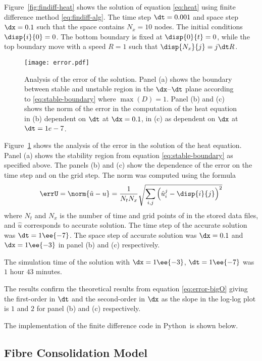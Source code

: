 \documentclass[twoside,a4paper,12pt,draft]{article}
\newcommand{\figref}[1]{Figure~\ref{#1}}
\newcommand{\prog}[1]{\textsf{#1}}
\newcommand{\python}{\prog{Python}}
\begin{document}
\figref{fig:findiff-heat} shows the solution of equation
\eqref{eq:heat} using finite difference method
\eqref{eq:findiff-alg}. The time step $\dt=0.001$ and space step
$\dx = 0.1$ such that the space contains $N_x=10$ nodes. The initial
conditions $\disp{i}{0} = 0$. The bottom boundary is fixed at
$\disp{0}{t} = 0$, while the top boundary move with a speed $R=1$ such
that $\disp{N_x}{j} = j \dt R$.


\begin{figure}
  \centering
  \texttt{[image: error.pdf]}
  \caption{Analysis of the error of the solution. Panel (a) shows the
    boundary between stable and unstable region in the $\dx$--$\dt$
    plane according to \eqref{eq:stable-boundary} where $\max(D) =
    1$. Panel (b) and (c) shows the norm of the error in the
    computation of the heat equation in (b) dependent on $\dt$ at
    $\dx=0.1$, in (c) as dependent on $\dx$ at $\dt=1e-7$.}
  \label{fig:error-analysis}
\end{figure}

\figref{fig:error-analysis} shows the analysis of the error in the
solution of the heat equation. Panel (a) shows the stability region
from equation \eqref{eq:stable-boundary} as specified above. The
panels (b) and (c) show the dependence of the error on the time step
and on the grid step. The norm was computed using the formula
%
\begin{align}
  \errU = \norm{\hat{u} - u} = \frac{1}{N_t N_x}\sqrt{ \sum_{i,j} \left(\hat{u}_{i}^{j} - \disp{i}{j}\right)^2}
\end{align}
where $N_t$ and $N_x$ is the number of time and grid points of in the
stored data files, and $\hat{u}$ corresponds to accurate solution. The
time step of the accurate solution was $\dt = 1\ee{-7}$. The space step
of accurate solution was $\dx=0.1$ and $\dx=1\ee{-3}$ in panel (b) and
(c) respectively.

The simulation time of the solution with $\dx=1\ee{-3}$, $\dt=1\ee{-7}$
was $1$ hour $43$ minutes.

The results confirm the theoretical results from equation
\eqref{eq:error-bigO} giving the first-order in $\dt$ and the
second-order in $\dx$ as the slope in the log-log plot is $1$ and $2$
for panel (b) and (c) respectively.

The implementation of the finite difference code in \python\ is shown
below.
%


\subsection{Fibre Consolidation Model}
\end{document}
